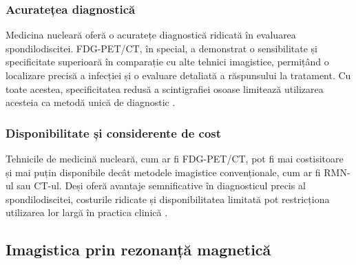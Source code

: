 \documentclass[romanian,12pt,a4paper]{article}
\begin{document}
\subsubsection{Acuratețea diagnostică}

Medicina nucleară oferă o acuratețe diagnostică ridicată în evaluarea
spondilodiscitei. FDG-PET/CT, în special, a demonstrat o sensibilitate
și specificitate superioară în comparație cu alte tehnici imagistice,
permițând o localizare precisă a infecției și o evaluare detaliată a
răspunsului la tratament. Cu toate acestea, specificitatea redusă a
scintigrafiei osoase limitează utilizarea acesteia ca metodă unică de
diagnostic
\cite{RadionuclideImagingMusculoskeletal2016}\cite{RoleNuclearMedicine2012}
.

\subsubsection{Disponibilitate și considerente de cost}

Tehnicile de medicină nucleară, cum ar fi FDG-PET/CT, pot fi mai
costisitoare și mai puțin disponibile decât metodele imagistice
convenționale, cum ar fi RMN-ul sau CT-ul. Deși oferă avantaje
semnificative în diagnosticul precis al spondilodiscitei, costurile
ridicate și disponibilitatea limitată pot restricționa utilizarea lor
largă în practica clinică \cite{ImagingAssessmentSpine2024}.

\subsection{Imagistica prin rezonanță magnetică}
\end{document}
